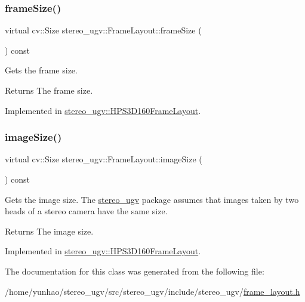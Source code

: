 \subsubsection{\texorpdfstring{frame\+Size()}{frameSize()}}
{\footnotesize\ttfamily virtual cv\+::\+Size stereo\+\_\+ugv\+::\+Frame\+Layout\+::frame\+Size (\begin{DoxyParamCaption}{ }\end{DoxyParamCaption}) const\hspace{0.3cm}{\ttfamily [pure virtual]}}



Gets the frame size. 

\begin{DoxyReturn}{Returns}
The frame size. 
\end{DoxyReturn}


Implemented in \hyperlink{classstereo__ugv_1_1HPS3D160FrameLayout_adce210d36dbcd42c685c2906e6ca37f3}{stereo\+\_\+ugv\+::\+H\+P\+S3\+D160\+Frame\+Layout}.

\mbox{\label{classstereo__ugv_1_1FrameLayout_a12cc36a89f8e66ffc6a2fa5eb3c5f648}} 
\subsubsection{\texorpdfstring{image\+Size()}{imageSize()}}
{\footnotesize\ttfamily virtual cv\+::\+Size stereo\+\_\+ugv\+::\+Frame\+Layout\+::image\+Size (\begin{DoxyParamCaption}{ }\end{DoxyParamCaption}) const\hspace{0.3cm}{\ttfamily [pure virtual]}}



Gets the image size. The \hyperlink{namespacestereo__ugv}{stereo\+\_\+ugv} package assumes that images taken by two heads of a stereo camera have the same size. 

\begin{DoxyReturn}{Returns}
The image size. 
\end{DoxyReturn}


Implemented in \hyperlink{classstereo__ugv_1_1HPS3D160FrameLayout_ac98bc2bb7cb4ed0eb28e33b162252832}{stereo\+\_\+ugv\+::\+H\+P\+S3\+D160\+Frame\+Layout}.



The documentation for this class was generated from the following file\+:\begin{DoxyCompactItemize}
\item 
/home/yunhao/stereo\+\_\+ugv/src/stereo\+\_\+ugv/include/stereo\+\_\+ugv/\hyperlink{frame__layout_8h}{frame\+\_\+layout.\+h}\end{DoxyCompactItemize}
